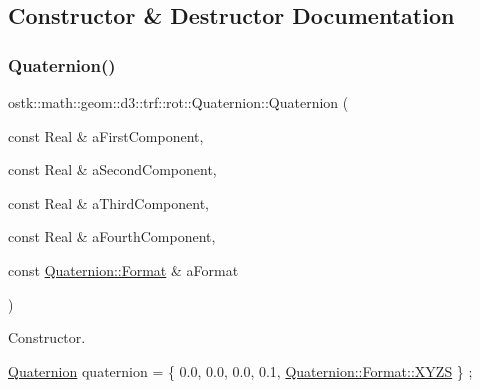 \subsection{Constructor \& Destructor Documentation}
\mbox{\label{classostk_1_1math_1_1geom_1_1d3_1_1trf_1_1rot_1_1_quaternion_ad9fd7d8eb5effb4d4e0394bbb5bb86dc}} 
\subsubsection{\texorpdfstring{Quaternion()}{Quaternion()}\hspace{0.1cm}{\footnotesize\ttfamily [1/3]}}
{\footnotesize\ttfamily ostk\+::math\+::geom\+::d3\+::trf\+::rot\+::\+Quaternion\+::\+Quaternion (\begin{DoxyParamCaption}\item[{const Real \&}]{a\+First\+Component,  }\item[{const Real \&}]{a\+Second\+Component,  }\item[{const Real \&}]{a\+Third\+Component,  }\item[{const Real \&}]{a\+Fourth\+Component,  }\item[{const \hyperlink{classostk_1_1math_1_1geom_1_1d3_1_1trf_1_1rot_1_1_quaternion_aa7a75f0dd505a58236ee355959e00bfd}{Quaternion\+::\+Format} \&}]{a\+Format }\end{DoxyParamCaption})}



Constructor. 


\begin{DoxyCode}
\hyperlink{classostk_1_1math_1_1geom_1_1d3_1_1trf_1_1rot_1_1_quaternion_ad9fd7d8eb5effb4d4e0394bbb5bb86dc}{Quaternion} quaternion = \{ 0.0, 0.0, 0.0, 0.1, \hyperlink{classostk_1_1math_1_1geom_1_1d3_1_1trf_1_1rot_1_1_quaternion_aa7a75f0dd505a58236ee355959e00bfda11c51ecd5dc6f86ba3c1ae79e21482f5}{Quaternion::Format::XYZS} \} 
      ;
\end{DoxyCode}



